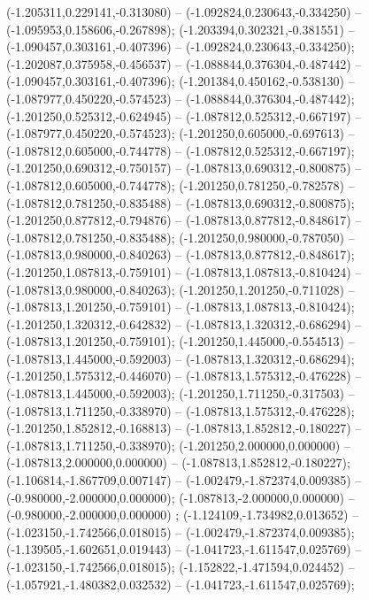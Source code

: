  (-1.205311,0.229141,-0.313080) -- (-1.092824,0.230643,-0.334250) -- (-1.095953,0.158606,-0.267898);
 (-1.203394,0.302321,-0.381551) -- (-1.090457,0.303161,-0.407396) -- (-1.092824,0.230643,-0.334250);
 (-1.202087,0.375958,-0.456537) -- (-1.088844,0.376304,-0.487442) -- (-1.090457,0.303161,-0.407396);
 (-1.201384,0.450162,-0.538130) -- (-1.087977,0.450220,-0.574523) -- (-1.088844,0.376304,-0.487442);
 (-1.201250,0.525312,-0.624945) -- (-1.087812,0.525312,-0.667197) -- (-1.087977,0.450220,-0.574523);
 (-1.201250,0.605000,-0.697613) -- (-1.087812,0.605000,-0.744778) -- (-1.087812,0.525312,-0.667197);
 (-1.201250,0.690312,-0.750157) -- (-1.087813,0.690312,-0.800875) -- (-1.087812,0.605000,-0.744778);
 (-1.201250,0.781250,-0.782578) -- (-1.087812,0.781250,-0.835488) -- (-1.087813,0.690312,-0.800875);
 (-1.201250,0.877812,-0.794876) -- (-1.087813,0.877812,-0.848617) -- (-1.087812,0.781250,-0.835488);
 (-1.201250,0.980000,-0.787050) -- (-1.087813,0.980000,-0.840263) -- (-1.087813,0.877812,-0.848617);
 (-1.201250,1.087813,-0.759101) -- (-1.087813,1.087813,-0.810424) -- (-1.087813,0.980000,-0.840263);
 (-1.201250,1.201250,-0.711028) -- (-1.087813,1.201250,-0.759101) -- (-1.087813,1.087813,-0.810424);
 (-1.201250,1.320312,-0.642832) -- (-1.087813,1.320312,-0.686294) -- (-1.087813,1.201250,-0.759101);
 (-1.201250,1.445000,-0.554513) -- (-1.087813,1.445000,-0.592003) -- (-1.087813,1.320312,-0.686294);
 (-1.201250,1.575312,-0.446070) -- (-1.087813,1.575312,-0.476228) -- (-1.087813,1.445000,-0.592003);
 (-1.201250,1.711250,-0.317503) -- (-1.087813,1.711250,-0.338970) -- (-1.087813,1.575312,-0.476228);
 (-1.201250,1.852812,-0.168813) -- (-1.087813,1.852812,-0.180227) -- (-1.087813,1.711250,-0.338970);
 (-1.201250,2.000000,0.000000) -- (-1.087813,2.000000,0.000000) -- (-1.087813,1.852812,-0.180227);
 (-1.106814,-1.867709,0.007147) -- (-1.002479,-1.872374,0.009385) -- (-0.980000,-2.000000,0.000000);
 (-1.087813,-2.000000,0.000000) -- (-0.980000,-2.000000,0.000000) ;
 (-1.124109,-1.734982,0.013652) -- (-1.023150,-1.742566,0.018015) -- (-1.002479,-1.872374,0.009385);
 (-1.139505,-1.602651,0.019443) -- (-1.041723,-1.611547,0.025769) -- (-1.023150,-1.742566,0.018015);
 (-1.152822,-1.471594,0.024452) -- (-1.057921,-1.480382,0.032532) -- (-1.041723,-1.611547,0.025769);
